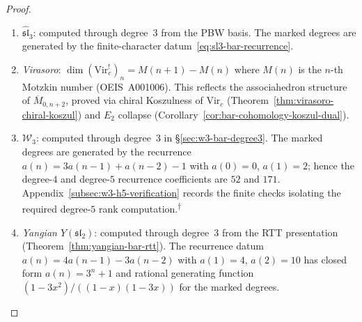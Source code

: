\begin{proof}
\begin{enumerate}
 (see Remark~\ref{rem:garland-lepowsky-sl2} and
 Appendix~\ref{subsec:riordan}).
\item \emph{$\widehat{\mathfrak{sl}}_3$}: computed through
 degree~$3$ from the PBW basis.  The marked degrees are generated by
 the finite-character datum~\eqref{eq:sl3-bar-recurrence}.
\item \emph{Virasoro}:
 $\dim (\mathrm{Vir}_c^!)_n = M(n{+}1) - M(n)$
 where $M(n)$ is the $n$-th Motzkin number
 (OEIS~A001006). This reflects the associahedron
 structure of $\overline{M}_{0,n+2}$, proved via
 chiral Koszulness of $\mathrm{Vir}_c$
 (Theorem~\ref{thm:virasoro-chiral-koszul}) and
 $E_2$ collapse
 (Corollary~\ref{cor:bar-cohomology-koszul-dual}).
\item \emph{$\mathcal{W}_3$}: computed through degree~$3$
 in \S\ref{sec:w3-bar-degree3}.  The marked degrees are generated by
 the recurrence $a(n) = 3a(n{-}1) + a(n{-}2) - 1$
 with $a(0)=0$, $a(1)=2$; hence the degree-$4$ and degree-$5$
 recurrence coefficients are $52$ and $171$.
 Appendix~\ref{subsec:w3-h5-verification} records the finite checks
 isolating the required degree-$5$ rank computation.\textsuperscript{$\dagger$}
\item \emph{Yangian $Y(\mathfrak{sl}_2)$}: computed through
 degree~$3$ from the RTT presentation
 (Theorem~\ref{thm:yangian-bar-rtt}).
 The recurrence datum $a(n)=4a(n{-}1)-3a(n{-}2)$ with
 $a(1)=4$, $a(2)=10$ has closed form $a(n)=3^n+1$ and rational
 generating function
 $(1-3x^2)/((1-x)(1-3x))$
 for the marked degrees.
\end{enumerate}
\end{proof}

